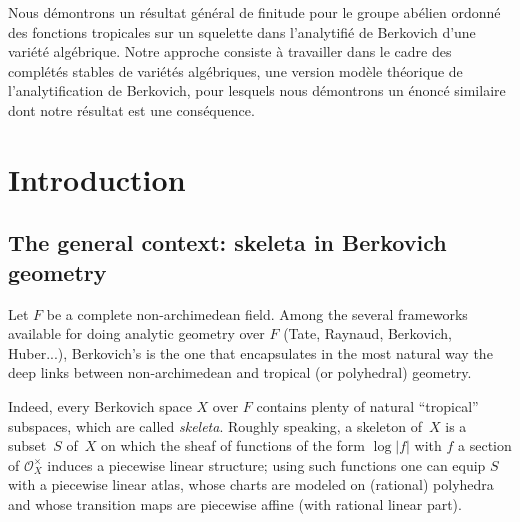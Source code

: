 \documentclass[JEP,XML,SOM,Unicode,ThmDefs,NoEqCountersInSection,published]{cedram}
\newcommand{\abs}[1]{\mathopen|#1\mathclose|}
\theoremstyle{plain}
\theoremstyle{definition}
\begin{document}




\begin{altabstract}
Nous démontrons un résultat général de finitude pour le groupe abélien ordonné des fonctions tropicales sur un squelette dans l'analytifié de Berkovich d'une variété algébrique. Notre approche consiste à travailler dans le cadre des complétés stables de variétés algébriques, une version modèle théorique de l'analytification de Berkovich, pour lesquels nous démontrons un énoncé similaire dont notre résultat est une conséquence.
\end{altabstract}

\maketitle

\tableofcontents
\mainmatter

\section{Introduction}
\subsection{The general context: skeleta in Berkovich geometry}
Let $F$ be a complete non-archimedean field. Among the several
frameworks available
for doing analytic geometry over $F$ (Tate, Raynaud, Berkovich, Huber...),
Berkovich's is the one that encapsulates in the most natural way the deep
links between non-archimedean and tropical (or polyhedral) geometry.

Indeed, every Berkovich space $X$ over $F$ contains plenty of natural ``tropical'' subspaces,
which are called \textit{skeleta}. Roughly speaking, a skeleton
of~$X$ is a subset~$S$ of~$X$ on which the sheaf of functions of the form
$\log \abs f$ with $f$ a section of $\mathscr O_X^\times$ induces a piecewise linear structure; \ie using such functions one can equip $S$
with a piecewise linear atlas, whose charts are modeled on
(rational) polyhedra and whose transition maps are piecewise affine (with rational linear part).
\end{document}
